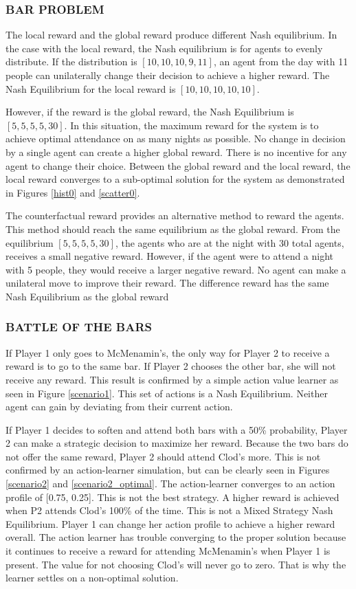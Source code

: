 \documentclass[letterpaper, 10 pt, conference]{ieeeconf}  %
\begin{document}
\subsubsection{BAR PROBLEM}

The local reward and the global reward produce different Nash equilibrium.  In the case with the local reward, the Nash equilibrium is for agents to evenly distribute.  If the distribution is $[10, 10, 10, 9, 11]$, an agent from the day with 11 people can unilaterally change their decision to achieve a higher reward.  The Nash Equilibrium for the local reward is $[10, 10, 10, 10, 10]$.

However, if the reward is the global reward, the Nash Equilibrium is $[5, 5, 5, 5, 30]$.  In this situation, the maximum reward for the system is to achieve optimal attendance on as many nights as possible.  No change in decision by a single agent can create a higher global reward.  There is no incentive for any agent to change their choice.  Between the global reward and the local reward, the local reward converges to a sub-optimal solution for the system as demonstrated in Figures \ref{hist0} and \ref{scatter0}.


The counterfactual reward provides an alternative method to reward the agents.  This method should reach the same equilibrium as the global reward. From the equilibrium $[5, 5, 5, 5, 30]$, the agents who are at the night with 30 total agents, receives a small negative reward.  However, if the agent were to attend a night with 5 people, they would receive a larger negative reward.  No agent can make a unilateral move to improve their reward.  The difference reward has the same Nash Equilibrium as the global reward

\subsubsection{BATTLE OF THE BARS}
If Player 1 only goes to McMenamin's, the only way for Player 2 to receive a reward is to go to the same bar.  If Player 2 chooses the other bar, she will not receive any reward.  This result is confirmed by a simple action value learner as seen in Figure \ref{scenario1}.  This set of actions is a Nash Equilibrium.  Neither agent can gain by deviating from their current action.

If Player 1 decides to soften and attend both bars with a 50\% probability, Player 2 can make a strategic decision to maximize her reward.  Because the two bars do not offer the same reward, Player 2 should attend Clod's more.  This is not confirmed by an action-learner simulation, but can be clearly seen in Figures \ref{scenario2} and  \ref{scenario2_optimal}.   The action-learner converges to an action profile of [0.75, 0.25].  This is not the best strategy.  A higher reward is achieved when P2 attends Clod's 100\% of the time.  This is not a Mixed Strategy Nash Equilibrium.  Player 1 can change her action profile to achieve a higher reward overall. The action learner has trouble converging to the proper solution because it continues to receive a reward for attending McMenamin's when Player 1 is present.  The value for not choosing Clod's will never go to zero.  That is why the learner settles on a non-optimal solution.
\end{document}
